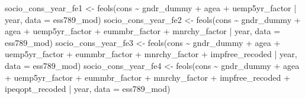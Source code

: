 \documentclass[
]{article}
\newenvironment{Shaded}{\begin{snugshade}}{\end{snugshade}}
\newcommand{\AttributeTok}[1]{\textcolor[rgb]{0.77,0.63,0.00}{#1}}
\newcommand{\FunctionTok}[1]{\textcolor[rgb]{0.00,0.00,0.00}{#1}}
\newcommand{\NormalTok}[1]{#1}
\newcommand{\OtherTok}[1]{\textcolor[rgb]{0.56,0.35,0.01}{#1}}
\newcommand{\SpecialCharTok}[1]{\textcolor[rgb]{0.00,0.00,0.00}{#1}}
\begin{document}
\begin{Shaded}
\begin{Highlighting}[]
\NormalTok{socio\_cons\_year\_fe1 }\OtherTok{\textless{}{-}} \FunctionTok{feols}\NormalTok{(cons }\SpecialCharTok{\textasciitilde{}}\NormalTok{ gndr\_dummy }\SpecialCharTok{+}\NormalTok{ agea }\SpecialCharTok{+}\NormalTok{ uemp5yr\_factor }\SpecialCharTok{|}\NormalTok{ year, }\AttributeTok{data =}\NormalTok{ ess789\_mod)}
\NormalTok{socio\_cons\_year\_fe2 }\OtherTok{\textless{}{-}} \FunctionTok{feols}\NormalTok{(cons }\SpecialCharTok{\textasciitilde{}}\NormalTok{ gndr\_dummy }\SpecialCharTok{+}\NormalTok{ agea }\SpecialCharTok{+}\NormalTok{ uemp5yr\_factor }\SpecialCharTok{+} 
\NormalTok{                              eummbr\_factor }\SpecialCharTok{+}\NormalTok{ mnrchy\_factor }\SpecialCharTok{|}\NormalTok{ year, }\AttributeTok{data =}\NormalTok{ ess789\_mod)}
\NormalTok{socio\_cons\_year\_fe3 }\OtherTok{\textless{}{-}} \FunctionTok{feols}\NormalTok{(cons }\SpecialCharTok{\textasciitilde{}}\NormalTok{ gndr\_dummy }\SpecialCharTok{+}\NormalTok{ agea }\SpecialCharTok{+}\NormalTok{ uemp5yr\_factor }\SpecialCharTok{+} 
\NormalTok{                              eummbr\_factor }\SpecialCharTok{+}\NormalTok{ mnrchy\_factor }\SpecialCharTok{+}\NormalTok{ impfree\_recoded }\SpecialCharTok{|}\NormalTok{ year, }\AttributeTok{data =}\NormalTok{ ess789\_mod)}
\NormalTok{socio\_cons\_year\_fe4 }\OtherTok{\textless{}{-}} \FunctionTok{feols}\NormalTok{(cons }\SpecialCharTok{\textasciitilde{}}\NormalTok{ gndr\_dummy }\SpecialCharTok{+}\NormalTok{ agea }\SpecialCharTok{+}\NormalTok{ uemp5yr\_factor }\SpecialCharTok{+} 
\NormalTok{                              eummbr\_factor }\SpecialCharTok{+}\NormalTok{ mnrchy\_factor }\SpecialCharTok{+}\NormalTok{ impfree\_recoded }\SpecialCharTok{+}\NormalTok{ ipeqopt\_recoded }\SpecialCharTok{|}\NormalTok{ year, }\AttributeTok{data =}\NormalTok{ ess789\_mod)}


\end{Highlighting}
\end{Shaded}
\end{document}
